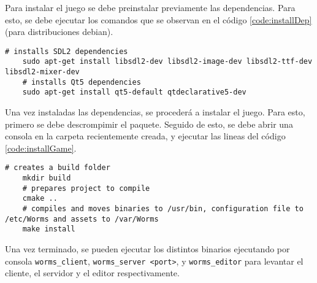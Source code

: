 Para instalar el juego se debe preinstalar previamente las dependencias. Para esto, se debe ejecutar los comandos que se observan en el código \ref{code:installDep} (para distribuciones debian).

\begin{lstlisting}[frame=single, caption=Instalación de dependencias, label=code:installDep]
	# installs SDL2 dependencies
	sudo apt-get install libsdl2-dev libsdl2-image-dev libsdl2-ttf-dev libsdl2-mixer-dev
	# installs Qt5 dependencies
	sudo apt-get install qt5-default qtdeclarative5-dev
\end{lstlisting}

Una vez instaladas las dependencias, se procederá a instalar el juego. Para esto, primero se debe descrompimir el paquete. Seguido de esto, se debe abrir una consola en la carpeta recientemente creada, y ejecutar las lineas del código \ref{code:installGame}.

\begin{lstlisting}[frame=single, caption=Instalación del juego, label=code:installGame]
	# creates a build folder
	mkdir build
	# prepares project to compile
	cmake ..
	# compiles and moves binaries to /usr/bin, configuration file to /etc/Worms and assets to /var/Worms 
	make install
\end{lstlisting}

Una vez terminado, se pueden ejecutar los distintos binarios ejecutando por consola \texttt{worms\_client}, \texttt{worms\_server <port>}, y \texttt{worms\_editor} para levantar el cliente, el servidor y el editor respectivamente.
